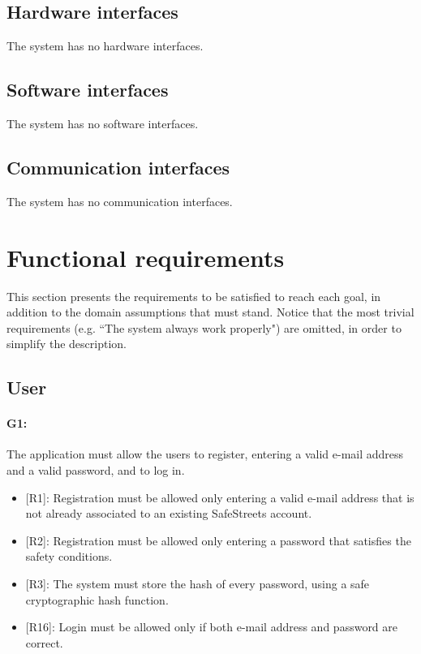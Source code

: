 \documentclass[12pt,a4paper]{report}
\begin{document}
		\subsection{Hardware interfaces}
			The system has no hardware interfaces.
		\subsection{Software interfaces}
			The system has no software interfaces.
		\subsection{Communication interfaces}
			The system has no communication interfaces.
	\section{Functional requirements}
		This section presents the requirements to be satisfied to reach each goal, in addition to the domain assumptions that must stand. Notice that the
		most trivial requirements (e.g. ``The system always work properly") are omitted, in order to simplify the description.
		\subsection{User} 

			\paragraph {G1:} The application must allow the users to register, entering a valid e-mail address and a valid password, and to log in.
			\begin{itemize}
				\item{[R1]}: Registration must be allowed only entering a valid e-mail address that is not already associated to an existing SafeStreets account.
				\item{[R2]}: Registration must be allowed only entering a password that satisfies the safety conditions.
				\item{[R3]}: The system must store the hash of every password, using a safe cryptographic hash function.
				\item{[R16]}: Login must be allowed only if both e-mail address and password are correct.
			\end{itemize}
\end{document}
